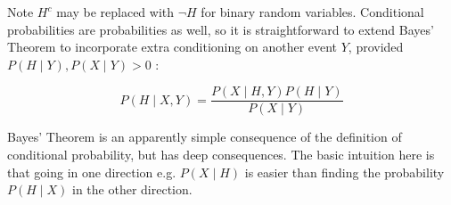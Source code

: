 Note $H^{c}$ may be replaced with $\neg H$ for binary random variables. Conditional probabilities are probabilities as well, so it is straightforward to extend Bayes' Theorem to incorporate extra conditioning on another event $Y$, provided $P(H \mid Y), P(X \mid Y)>0$ :

$$
P(H \mid X, Y)=\frac{P(X \mid H, Y) P(H \mid Y)}{P(X \mid Y)}
$$

Bayes' Theorem is an apparently simple consequence of the definition of conditional probability, but has deep consequences. The basic intuition here is that going in one direction e.g. $P(X \mid H)$ is easier than finding the probability $P(H \mid X)$ in the other direction.


